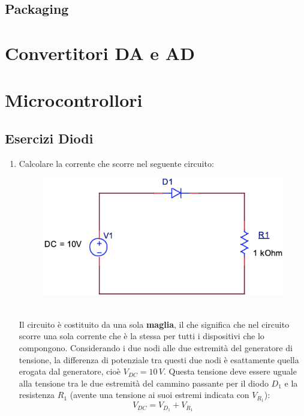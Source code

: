 \documentclass[12pt, a4paper]{report}
\begin{document}
\section{Packaging}


\chapter{Convertitori DA e AD}
\chapter{Microcontrollori}

\begin{appendices}

\chapter{Esercizi Diodi}
\begin{enumerate}
    \item Calcolare la corrente che scorre nel seguente circuito:
    \begin{figure}[h]
        \centering
        \includegraphics[scale=0.3,angle=0]{diodi_es1.png}
    \end{figure}
    \\Il circuito è costituito da una sola \textbf{maglia}, il che significa che nel circuito scorre una sola corrente che è la stessa per tutti i dispositivi che lo compongono. Considerando i due nodi alle due estremità del generatore di tensione, la differenza di potenziale tra questi due nodi è esattamente quella erogata dal generatore, cioè $V_{DC} = 10\,V$. Questa tensione deve essere uguale alla tensione tra le due estremità del cammino passante per il diodo $D_1$ e la resistenza $R_1$ (avente una tensione ai suoi estremi indicata con $V_{R_1}$):
    \begin{equation}
        V_{DC} = V_{D_1} + V_{R_1}

\end{equation}
\end{enumerate}
\end{appendices}
\end{document}
